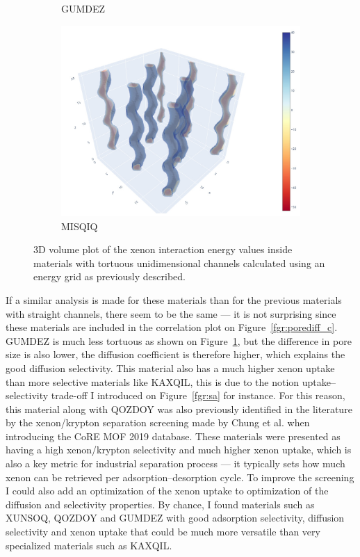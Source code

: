 \documentclass[main]{subfiles}
\begin{document}
\begin{figure}[ht]
\begin{subfigure}[b]{0.3\textwidth}
      \caption{GUMDEZ~\cite{Yin_2014}}\label{fgr:zigzag_b}
  \end{subfigure}
  \hfill
  \begin{subfigure}[b]{0.3\textwidth}
      \centering
      \includegraphics[width=\textwidth]{figures/5-diffusion/viz/MISQIQ.jpg}
      \caption{MISQIQ~\cite{Tong_2013}}\label{fgr:zigzag_c}
  \end{subfigure}
     \caption{ 3D volume plot of the xenon interaction energy values inside materials with tortuous unidimensional channels calculated using an energy grid as previously described.}\label{fgr:zigzag}
\end{figure}

If a similar analysis is made for these materials than for the previous materials with straight channels, there seem to be the same --- it is not surprising since these materials are included in the correlation plot on Figure~\ref{fgr:porediff_c}. GUMDEZ is much less tortuous as shown on Figure~\ref{fgr:zigzag_b}, but the difference in pore size is also lower, the diffusion coefficient is therefore higher, which explains the good diffusion selectivity. This material also has a much higher xenon uptake than more selective materials like KAXQIL, this is due to the notion uptake--selectivity trade-off I introduced on Figure~\ref{fgr:sa} for instance. For this reason, this material along with QOZDOY was also previously identified in the literature by the xenon/krypton separation screening made by Chung et al.\autocite{Chung_2019} when introducing the CoRE MOF 2019 database. These materials were presented as having a high xenon/krypton selectivity and much higher xenon uptake, which is also a key metric for industrial separation process --- it typically sets how much xenon can be retrieved per adsorption--desorption cycle. To improve the screening I could also add an optimization of the xenon uptake to optimization of the diffusion and selectivity properties. By chance, I found materials such as XUNSOQ, QOZDOY and GUMDEZ with good adsorption selectivity, diffusion selectivity and xenon uptake that could be much more versatile than very specialized materials such as KAXQIL. 
\end{document}
